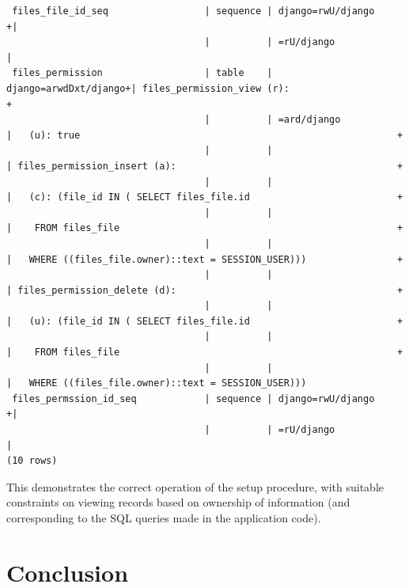 \documentclass{article}
\begin{document}
\begin{landscape}
{\begin{verbatim}
 files_file_id_seq                 | sequence | django=rwU/django    +|
                                   |          | =rU/django            |
 files_permission                  | table    | django=arwdDxt/django+| files_permission_view (r):                                         +
                                   |          | =ard/django           |   (u): true                                                        +
                                   |          |                       | files_permission_insert (a):                                       +
                                   |          |                       |   (c): (file_id IN ( SELECT files_file.id                          +
                                   |          |                       |    FROM files_file                                                 +
                                   |          |                       |   WHERE ((files_file.owner)::text = SESSION_USER)))                +
                                   |          |                       | files_permission_delete (d):                                       +
                                   |          |                       |   (u): (file_id IN ( SELECT files_file.id                          +
                                   |          |                       |    FROM files_file                                                 +
                                   |          |                       |   WHERE ((files_file.owner)::text = SESSION_USER)))
 files_permssion_id_seq            | sequence | django=rwU/django    +|
                                   |          | =rU/django            |
(10 rows)
\end{verbatim}
  }

  This demonstrates the correct operation of the setup procedure, with suitable constraints on viewing records based on ownership of information (and corresponding to the SQL queries made in the application code).

\end{landscape}

\section{Conclusion}
\end{document}
